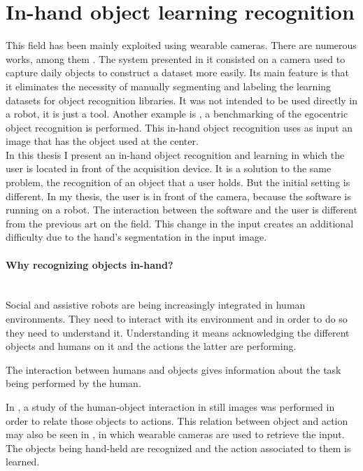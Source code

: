 \section{In-hand object learning recognition}
This field has been mainly exploited using wearable cameras. 
There are numerous works, among them \cite{Roth2006}. The system presented in it consisted on a camera used to capture daily objects to construct a dataset more easily. 
Its main feature is that it eliminates the necessity of manually segmenting and labeling the learning datasets for object recognition libraries. 
It was not intended to be used directly in a robot, it is just a tool. 
Another example is \cite{Philipose2009}, a benchmarking of the egocentric object recognition is performed. 
This in-hand object recognition uses as input an image that has the object used at the center. 
\\

In this thesis I present an in-hand object recognition and learning in which the user is located in front of the acquisition device. 
It is a solution to the same problem, the recognition of an object that a user holds. 
But the initial setting is different. 
In my thesis, the user is in front of the camera, because the software is running on a robot. 
The interaction between the software and the user is different from the previous art on the field. 
This change in the input creates an additional difficulty due to the hand's segmentation in the input image. 

\paragraph{Why recognizing objects in-hand?}\mbox{}\\


	Social and assistive robots are being increasingly integrated in human environments. 
	They need to interact with its environment and in order to do so they need to understand it. 
	Understanding it means acknowledging the different objects and humans on it and the actions the latter are performing. 

	The interaction between humans and objects gives information about the task being performed by the human. 

	In \cite{Delaitre}, a study of the human-object interaction in still images was performed in order to relate those objects to actions. 
	This relation between object and action may also be seen in \cite{Fathi}, in which wearable cameras are used to retrieve the input. 
	The objects being hand-held are recognized and the action associated to them is learned. 
	\\

